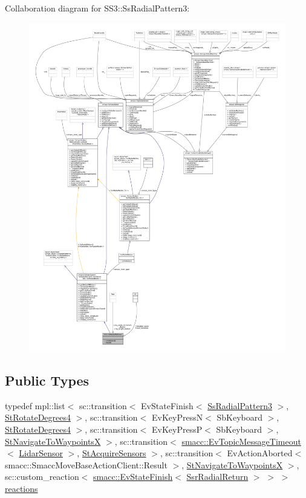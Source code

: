 Collaboration diagram for S\+S3\+:\+:Ss\+Radial\+Pattern3\+:
\nopagebreak
\begin{figure}[H]
\begin{center}
\leavevmode
\includegraphics[width=350pt]{structSS3_1_1SsRadialPattern3__coll__graph}
\end{center}
\end{figure}
\subsection*{Public Types}
\begin{DoxyCompactItemize}
\item 
typedef mpl\+::list$<$ sc\+::transition$<$ Ev\+State\+Finish$<$ \hyperlink{structSS3_1_1SsRadialPattern3}{Ss\+Radial\+Pattern3} $>$, \hyperlink{structStRotateDegrees4}{St\+Rotate\+Degrees4} $>$, sc\+::transition$<$ Ev\+Key\+PressN$<$ Sb\+Keyboard $>$, \hyperlink{structStRotateDegrees4}{St\+Rotate\+Degrees4} $>$, sc\+::transition$<$ Ev\+Key\+PressP$<$ Sb\+Keyboard $>$, \hyperlink{structStNavigateToWaypointsX}{St\+Navigate\+To\+WaypointsX} $>$, sc\+::transition$<$ \hyperlink{structsmacc_1_1EvTopicMessageTimeout}{smacc\+::\+Ev\+Topic\+Message\+Timeout}$<$ \hyperlink{sensor__state_8h_a9db9e1944f88de79507758d08e4a2ee3}{Lidar\+Sensor} $>$, \hyperlink{structStAcquireSensors}{St\+Acquire\+Sensors} $>$, sc\+::transition$<$ Ev\+Action\+Aborted$<$ smacc\+::\+Smacc\+Move\+Base\+Action\+Client\+::\+Result $>$, \hyperlink{structStNavigateToWaypointsX}{St\+Navigate\+To\+WaypointsX} $>$, sc\+::custom\+\_\+reaction$<$ \hyperlink{structsmacc_1_1EvStateFinish}{smacc\+::\+Ev\+State\+Finish}$<$ \hyperlink{structSsrRadialReturn}{Ssr\+Radial\+Return} $>$ $>$ $>$ \hyperlink{structSS3_1_1SsRadialPattern3_ac801cd34c84a9e131bf18a25472e30a2}{reactions}
\end{DoxyCompactItemize}
